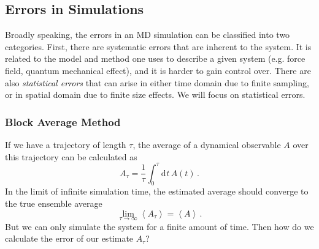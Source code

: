 \documentclass{article}
\theoremstyle{plain}\theoremheaderfont{\normalfont\itshape}\theorembodyfont{\rmfamily}\theoremseparator{.}\newtheorem*{rem}{Remark}\newtheorem*{ex}{Example}\newtheorem*{proof}{Proof}\newtheorem*{altp}{Alternative proof}
\theoremstyle{plain}\theoremheaderfont{\normalfont\bfseries}\theorembodyfont{\rmfamily}\theoremseparator{.}\newtheorem{thm}{Theorem}[section]\newtheorem{lem}[thm]{Lemma}\newtheorem{prop}[thm]{Proposition}\newtheorem*{cor}{Corollary}\newtheorem{defn}[thm]{Definition}\newtheorem{clm}[thm]{Claim}\newtheorem{clminproof}{Claim}\newtheorem{alg}[thm]{Algorithm}\newtheorem{hyp}[thm]{Hypothesis}\newtheorem{law}[thm]{Law}
\theoremstyle{break}\theoremheaderfont{\normalfont\itshape}\theorembodyfont{\rmfamily}\theoremseparator{.\medskip}\newtheorem*{proofskip}{Proof}\newtheorem*{exs}{Examples}\newtheorem*{rems}{Remarks}
\theoremstyle{break}\theoremheaderfont{\normalfont\bfseries}\theorembodyfont{\rmfamily}\theoremseparator{.\medskip}\newtheorem{lemskip}[thm]{Lemma}\newtheorem{defnskip}[thm]{Definition}\newtheorem{propskip}[thm]{Proposition}\newtheorem{thmskip}[thm]{Theorem}
\numberwithin{equation}{section}
\newcommand{\dd}[2][]{\mathrm{d}^{#1} #2\,}
\newcommand{\eval}[1]{\left\langle #1 \right\rangle}
\begin{document}
    \subsection{Errors in Simulations}
    Broadly speaking, the errors in an MD simulation can be classified into two categories. First, there are systematic errors that are inherent to the system. It is related to the model and method one uses to describe a given system (e.g. force field, quantum mechanical effect), and it is harder to gain control over. There are also \textit{statistical errors} that can arise in either time domain due to finite sampling, or in spatial domain due to finite size effects. We will focus on statistical errors.

    \subsubsection{Block Average Method}
    If we have a trajectory of length \(\tau\), the average of a dynamical observable \(A\) over this trajectory can be calculated as
    \begin{equation}
        A_\tau=\frac{1}{\tau}\int_0^\tau \dd{t}A(t)\,.
    \end{equation}
    In the limit of infinite simulation time, the estimated average should converge to the true ensemble average
    \begin{equation}
        \lim_{\tau\to\infty}\eval{A_\tau}=\eval{A}\,.
    \end{equation}
    But we can only simulate the system for a finite amount of time. Then how do we calculate the error of our estimate \(A_\tau\)?
\end{document}
